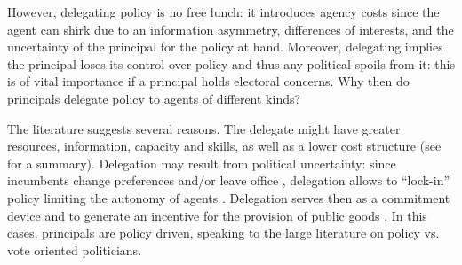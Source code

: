 \documentclass[12pt]{amsart}
\numberwithin{equation}{section}
\theoremstyle{definition}
\theoremstyle{definition}
\theoremstyle{definition}
\begin{document}
 However, delegating policy is no free lunch: it introduces agency costs since the agent can shirk due to an information asymmetry, differences of interests, and the uncertainty of the principal for the policy at hand. Moreover, delegating implies the principal loses its control over policy and thus any political spoils from it: this is of vital importance if a principal holds electoral concerns. Why then do principals delegate policy to agents of different kinds? %

 
   
The literature suggests several reasons. The delegate might have greater resources, information, capacity and skills, as well as a lower cost structure (see \citet{bolton_dewatripont_2005} for a summary). Delegation may result from political uncertainty: since incumbents change preferences and/or leave office \citep{moe_1989, shepsle_1992, horn_1995}, delegation  allows to ``lock-in'' policy limiting the autonomy of agents \citep{de_figueiredo_2002}.  Delegation serves then as a commitment device \citep{schelling_1960} and to generate an incentive for the provision of public goods \citep{aguion_tirole_1997}. In this cases, principals are policy driven, speaking to the large literature on policy vs. vote oriented politicians. 
  
\end{document}
